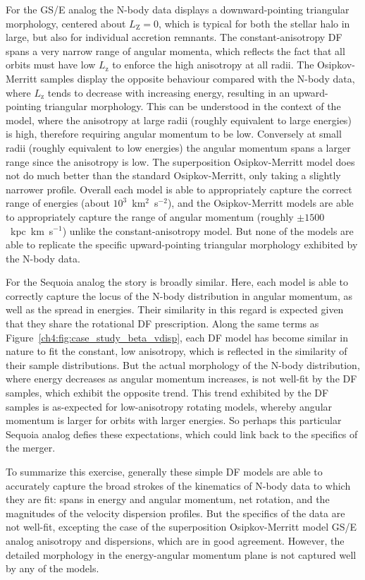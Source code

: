 For the GS/E analog the N-body data displays a downward-pointing triangular morphology, centered about $L_\mathrm{Z}=0$, which is typical for both the stellar halo in large, but also for individual accretion remnants. The constant-anisotropy DF spans a very narrow range of angular momenta, which reflects the fact that all orbits must have low $L_\mathrm{z}$ to enforce the high anisotropy at all radii. The Osipkov-Merritt samples display the opposite behaviour compared with the N-body data, where $L_\mathrm{z}$ tends to decrease with increasing energy, resulting in an upward-pointing triangular morphology. This can be understood in the context of the model, where the anisotropy at large radii (roughly equivalent to large energies) is high, therefore requiring angular momentum to be low. Conversely at small radii (roughly equivalent to low energies) the angular momentum spans a larger range since the anisotropy is low. The superposition Osipkov-Merritt model does not do much better than the standard Osipkov-Merritt, only taking a slightly narrower profile. Overall each model is able to appropriately capture the correct range of energies (about $10^{3}$~km$^{2}$~s$^{-2}$), and the Osipkov-Merritt models are able to appropriately capture the range of angular momentum (roughly $\pm 1500$~kpc~km~s$^{-1}$) unlike the constant-anisotropy model. But none of the models are able to replicate the specific upward-pointing triangular morphology exhibited by the N-body data.

For the Sequoia analog the story is broadly similar. Here, each model is able to correctly capture the locus of the N-body distribution in angular momentum, as well as the spread in energies. Their similarity in this regard is expected given that they share the rotational DF prescription. Along the same terms as Figure~\ref{ch4:fig:case_study_beta_vdisp}, each DF model has become similar in nature to fit the constant, low anisotropy, which is reflected in the similarity of their sample distributions. But the actual morphology of the N-body distribution, where energy decreases as angular momentum increases, is not well-fit by the DF samples, which exhibit the opposite trend. This trend exhibited by the DF samples is as-expected for low-anisotropy rotating models, whereby angular momentum is larger for orbits with larger energies. So perhaps this particular Sequoia analog defies these expectations, which could link back to the specifics of the merger.

To summarize this exercise, generally these simple DF models are able to accurately capture the broad strokes of the kinematics of N-body data to which they are fit: spans in energy and angular momentum, net rotation, and the magnitudes of the velocity dispersion profiles. But the specifics of the data are not well-fit, excepting the case of the superposition Osipkov-Merritt model GS/E analog anisotropy and dispersions, which are in good agreement. However, the detailed morphology in the energy-angular momentum plane is not captured well by any of the models.

